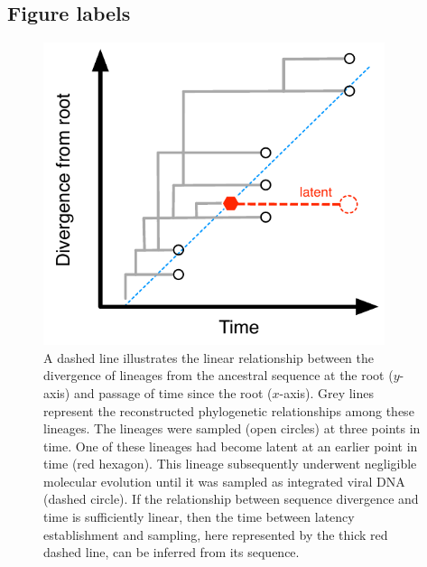 \documentclass{bmcart}
\begin{document}
\begin{backmatter}


\section * {Figure labels}

\begin{figure}[h!]
	\centering
	\includegraphics[width=10cm]{latency-scheme}
	\caption{%
	A dashed line illustrates the linear relationship between the divergence of lineages from the ancestral sequence at the root ($y$-axis) and passage of time since the root ($x$-axis).
	Grey lines represent the reconstructed phylogenetic relationships among these lineages.
	The lineages were sampled (open circles) at three points in time.
	One of these lineages had become latent at an earlier point in time (red hexagon).
	This lineage subsequently underwent negligible molecular evolution until it was sampled as integrated viral DNA (dashed circle).
	If the relationship between sequence divergence and time is sufficiently linear, then the time between latency establishment and sampling, here represented by the thick red dashed line, can be inferred from its sequence.
	}
	\label{fig:latenttree}
\end{figure}



\end{backmatter}
\end{document}
